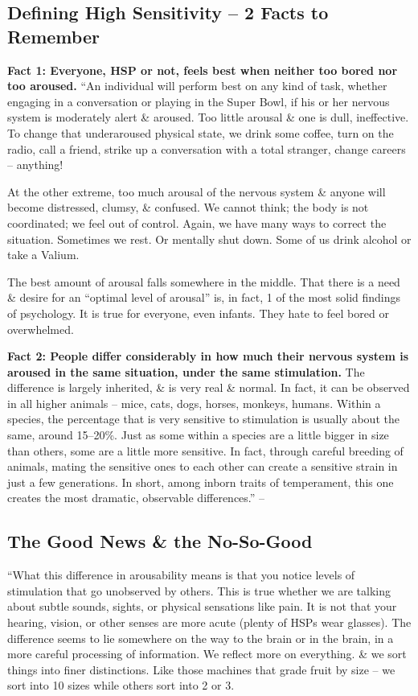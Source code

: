 \documentclass{article}
\numberwithin{equation}{section}
\begin{document}
\subsection{Defining High Sensitivity -- 2 Facts to Remember}
\textbf{Fact 1: Everyone, HSP or not, feels best when neither too bored nor too aroused.} ``An individual will perform best on any kind of task, whether engaging in a conversation or playing in the Super Bowl, if his or her nervous system is moderately alert \& aroused. Too little arousal \& one is dull, ineffective. To change that underaroused physical state, we drink some coffee, turn on the radio, call a friend, strike up a conversation with a total stranger, change careers -- anything!

At the other extreme, too much arousal of the nervous system \& anyone will become distressed, clumsy, \& confused. We cannot think; the body is not coordinated; we feel out of control. Again, we have many ways to correct the situation. Sometimes we rest. Or mentally shut down. Some of us drink alcohol or take a Valium.

The best amount of arousal falls somewhere in the middle. That there is a need \& desire for an ``optimal level of arousal'' is, in fact, 1 of the most solid findings of psychology. It is true for everyone, even infants. They hate to feel bored or overwhelmed.

\textbf{Fact 2: People differ considerably in how much their nervous system is aroused in the same situation, under the same stimulation.} The difference is largely inherited, \& is very real \& normal. In fact, it can be observed in all higher animals -- mice, cats, dogs, horses, monkeys, humans. Within a species, the percentage that is very sensitive to stimulation is usually about the same, around 15--20\%. Just as some within a species are a little bigger in size than others, some are a little more sensitive. In fact, through careful breeding of animals, mating the sensitive ones to each other can create a sensitive strain in just a few generations. In short, among inborn traits of temperament, this one creates the most dramatic, observable differences.'' -- \cite[p. 40]{Aron2013}

\subsection{The Good News \& the No-So-Good}
``What this difference in arousability means is that you notice levels of stimulation that go unobserved by others. This is true whether we are talking about subtle sounds, sights, or physical sensations like pain. It is not that your hearing, vision, or other senses are more acute (plenty of HSPs wear glasses). The difference seems to lie somewhere on the way to the brain or in the brain, in a more careful processing of information. We reflect more on everything. \& we sort things into finer distinctions. Like those machines that grade fruit by size -- we sort into 10 sizes while others sort into 2 or 3.
\end{document}
